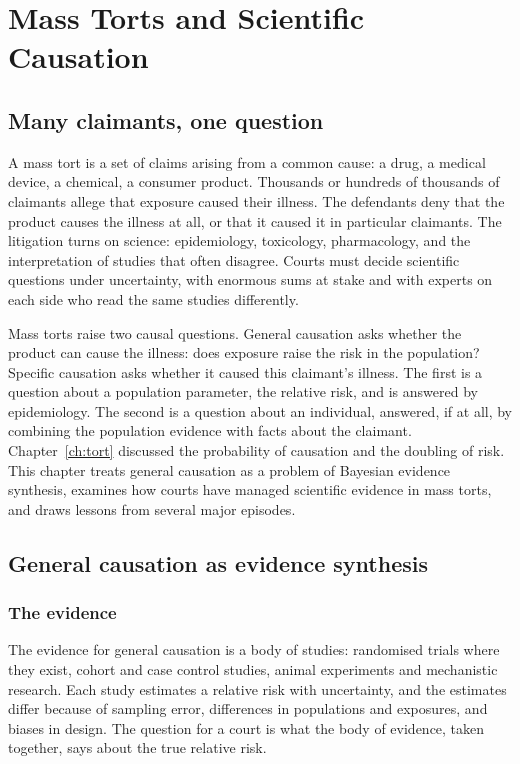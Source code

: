 \chapter{Mass Torts and Scientific Causation}
\label{ch:masstorts}

\section{Many claimants, one question}

A mass tort is a set of claims arising from a common cause: a drug, a medical device, a chemical, a consumer product. Thousands or hundreds of thousands of claimants allege that exposure caused their illness. The defendants deny that the product causes the illness at all, or that it caused it in particular claimants. The litigation turns on science: epidemiology, toxicology, pharmacology, and the interpretation of studies that often disagree. Courts must decide scientific questions under uncertainty, with enormous sums at stake and with experts on each side who read the same studies differently.

Mass torts raise two causal questions. General causation asks whether the product can cause the illness: does exposure raise the risk in the population? Specific causation asks whether it caused this claimant's illness. The first is a question about a population parameter, the relative risk, and is answered by epidemiology. The second is a question about an individual, answered, if at all, by combining the population evidence with facts about the claimant. Chapter~\ref{ch:tort} discussed the probability of causation and the doubling of risk. This chapter treats general causation as a problem of Bayesian evidence synthesis, examines how courts have managed scientific evidence in mass torts, and draws lessons from several major episodes.

\section{General causation as evidence synthesis}

\subsection{The evidence}

The evidence for general causation is a body of studies: randomised trials where they exist, cohort and case control studies, animal experiments and mechanistic research. Each study estimates a relative risk with uncertainty, and the estimates differ because of sampling error, differences in populations and exposures, and biases in design. The question for a court is what the body of evidence, taken together, says about the true relative risk.

